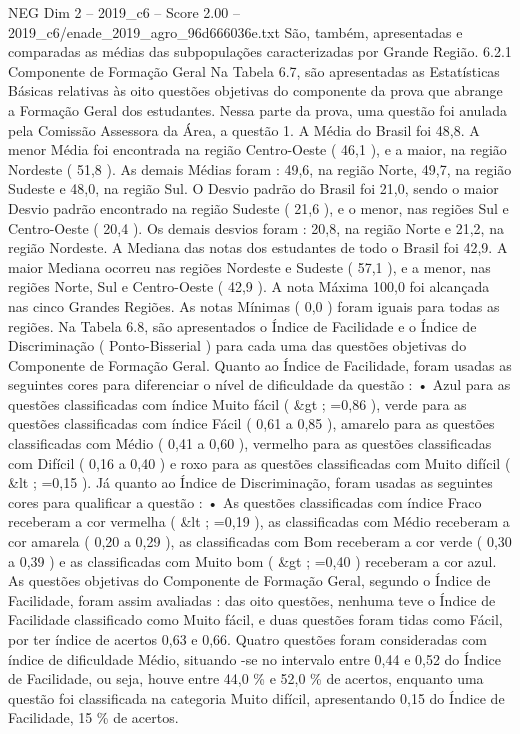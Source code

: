 \begin{textsample}{NEG Dim 2 – 2019\_c6 – Score 2.00 – 2019\_c6/enade\_2019\_agro\_96d666036e.txt}
São, também, apresentadas e comparadas as médias das subpopulações caracterizadas por Grande Região. 6.2.1 Componente de Formação Geral Na Tabela 6.7, são apresentadas as Estatísticas Básicas relativas às oito questões objetivas do componente da prova que abrange a Formação Geral dos estudantes.
Nessa parte da prova, uma questão foi anulada pela Comissão Assessora da Área, a questão 1.
A Média do Brasil foi 48,8.
A menor Média foi encontrada na região Centro-Oeste ( 46,1 ), e a maior, na região Nordeste ( 51,8 ).
As demais Médias foram : 49,6, na região Norte, 49,7, na região Sudeste e 48,0, na região Sul.
O Desvio padrão do Brasil foi 21,0, sendo o maior Desvio padrão encontrado na região Sudeste ( 21,6 ), e o menor, nas regiões Sul e Centro-Oeste ( 20,4 ).
Os demais desvios foram : 20,8, na região Norte e 21,2, na região Nordeste.
A Mediana das notas dos estudantes de todo o Brasil foi 42,9.
A maior Mediana ocorreu nas regiões Nordeste e Sudeste ( 57,1 ), e a menor, nas regiões Norte, Sul e Centro-Oeste ( 42,9 ).
A nota Máxima 100,0 foi alcançada nas cinco Grandes Regiões.
As notas Mínimas ( 0,0 ) foram iguais para todas as regiões.
Na Tabela 6.8, são apresentados o Índice de Facilidade e o Índice de Discriminação ( Ponto-Bisserial ) para cada uma das questões objetivas do Componente de Formação Geral.
Quanto ao Índice de Facilidade, foram usadas as seguintes cores para diferenciar o nível de dificuldade da questão : • Azul para as questões classificadas com índice Muito fácil ( \&gt ; =0,86 ), verde para as questões classificadas com índice Fácil ( 0,61 a 0,85 ), amarelo para as questões classificadas com Médio ( 0,41 a 0,60 ), vermelho para as questões classificadas com Difícil ( 0,16 a 0,40 ) e roxo para as questões classificadas com Muito difícil ( \&lt ; =0,15 ).
Já quanto ao Índice de Discriminação, foram usadas as seguintes cores para qualificar a questão : • As questões classificadas com índice Fraco receberam a cor vermelha ( \&lt ; =0,19 ), as classificadas com Médio receberam a cor amarela ( 0,20 a 0,29 ), as classificadas com Bom receberam a cor verde ( 0,30 a 0,39 ) e as classificadas com Muito bom ( \&gt ; =0,40 ) receberam a cor azul.
As questões objetivas do Componente de Formação Geral, segundo o Índice de Facilidade, foram assim avaliadas : das oito questões, nenhuma teve o Índice de Facilidade classificado como Muito fácil, e duas questões foram tidas como Fácil, por ter índice de acertos 0,63 e 0,66.
Quatro questões foram consideradas com índice de dificuldade Médio, situando -se no intervalo entre 0,44 e 0,52 do Índice de Facilidade, ou seja, houve entre 44,0 \% e 52,0 \% de acertos, enquanto uma questão foi classificada na categoria Muito difícil, apresentando 0,15 do Índice de Facilidade, 15 \% de acertos.

\end{textsample}
